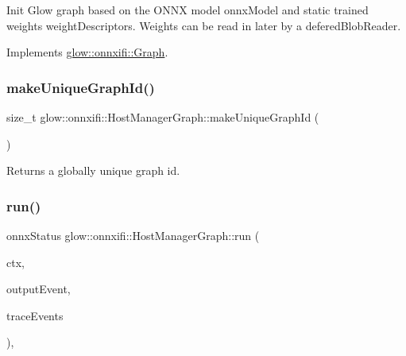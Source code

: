 Init Glow graph based on the O\+N\+NX model {\ttfamily onnx\+Model} and static trained weights {\ttfamily weight\+Descriptors}. Weights can be read in later by a {\ttfamily defered\+Blob\+Reader}. 

Implements \hyperlink{classglow_1_1onnxifi_1_1_graph_a5f1ec69446852a2515d8aeec487a521a}{glow\+::onnxifi\+::\+Graph}.

\mbox{\label{classglow_1_1onnxifi_1_1_host_manager_graph_ada051c02bd3aa8b0b2cd109cc306893f}} 
\subsubsection{\texorpdfstring{make\+Unique\+Graph\+Id()}{makeUniqueGraphId()}}
{\footnotesize\ttfamily size\+\_\+t glow\+::onnxifi\+::\+Host\+Manager\+Graph\+::make\+Unique\+Graph\+Id (\begin{DoxyParamCaption}{ }\end{DoxyParamCaption})\hspace{0.3cm}{\ttfamily [static]}}

\begin{DoxyReturn}{Returns}
a globally unique graph id. 
\end{DoxyReturn}
\mbox{\label{classglow_1_1onnxifi_1_1_host_manager_graph_a962669c45b8c354730f150ca64f1a6c0}} 
\subsubsection{\texorpdfstring{run()}{run()}}
{\footnotesize\ttfamily onnx\+Status glow\+::onnxifi\+::\+Host\+Manager\+Graph\+::run (\begin{DoxyParamCaption}\item[{std\+::unique\+\_\+ptr$<$ \hyperlink{classglow_1_1_execution_context}{Execution\+Context} $>$}]{ctx,  }\item[{\hyperlink{classglow_1_1onnxifi_1_1_event}{Event\+Ptr}}]{output\+Event,  }\item[{onnx\+Trace\+Event\+List $\ast$}]{trace\+Events }\end{DoxyParamCaption})\hspace{0.3cm}{\ttfamily [override]}, {\ttfamily [virtual]}}

